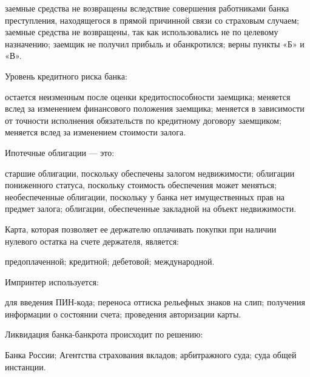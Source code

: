\documentclass[12pt, table]{exam}
\begin{document}
\begin{questions}
\begin{multicols}{2}
	 \begin{choices}
	 \choice заемные средства не возвращены вследствие совершения работниками банка преступления, находящегося в прямой причинной связи со страховым случаем;
	 \choice заемные средства не возвращены, так как использовались не по целевому назначению;
	 \CC заемщик не получил прибыль и обанкротился;
	 \choice верны пункты «Б» и «В».
	 \end{choices}
\question Уровень кредитного риска банка:
	 \begin{choices}
	 \CC остается неизменным после оценки кредитоспособности заемщика;
	 \choice меняется вслед за изменением финансового положения заемщика;
	 \choice меняется в зависимости от точности исполнения обязательств по кредитному договору заемщиком;
	 \choice меняется вслед за изменением стоимости залога.
	 \end{choices}
\question Ипотечные облигации — это:
	 \begin{choices}
	 \choice старшие облигации, поскольку обеспечены залогом недвижимости;
	 \choice облигации пониженного статуса, поскольку стоимость обеспечения может меняться;
	 \CC необеспеченные облигации, поскольку у банка нет имущественных прав на предмет залога;
	 \choice облигации, обеспеченные закладной на объект недвижимости.
	 \end{choices}
\question Карта, которая позволяет ее держателю оплачивать покупки при наличии нулевого остатка на счете держателя, является:
	 \begin{choices}
	 \choice предоплаченной;
	 \choice кредитной;
	 \CC дебетовой;
	 \choice международной.
	 \end{choices}
\question Импринтер используется:
	 \begin{choices}
	 \choice для введения ПИН-кода;
	 \choice переноса оттиска рельефных знаков на слип;
	 \choice получения информации о состоянии счета;
	 \CC проведения авторизации карты.
	 \end{choices}
\question Ликвидация банка-банкрота происходит по решению:
	 \begin{choices}
	 \choice Банка России;
	 \choice Агентства страхования вкладов;
	 \choice арбитражного суда;
	 \CC суда общей инстанции.
	 \end{choices}



\end{multicols}
\end{questions}
\end{document}
